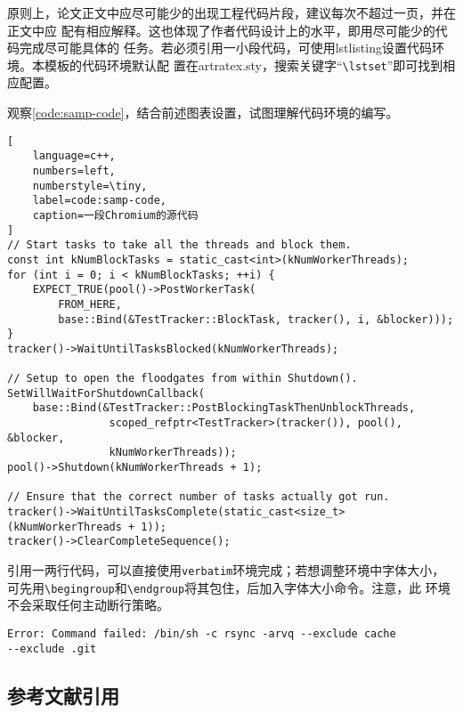 原则上，论文正文中应尽可能少的出现工程代码片段，建议每次不超过一页，并在正文中应
配有相应解释。这也体现了作者代码设计上的水平，即用尽可能少的代码完成尽可能具体的
任务。若必须引用一小段代码，可使用lstlisting设置代码环境。本模板的代码环境默认配
置在artratex.sty，搜索关键字“\verb|\lstset|”即可找到相应配置。

观察\autoref{code:samp-code}，结合前述图表设置，试图理解代码环境的编写。

\begin{lstlisting}[
    language=c++,
    numbers=left,
    numberstyle=\tiny,
    label=code:samp-code,
    caption=一段Chromium的源代码
]
// Start tasks to take all the threads and block them.
const int kNumBlockTasks = static_cast<int>(kNumWorkerThreads);
for (int i = 0; i < kNumBlockTasks; ++i) {
    EXPECT_TRUE(pool()->PostWorkerTask(
        FROM_HERE,
        base::Bind(&TestTracker::BlockTask, tracker(), i, &blocker)));
}
tracker()->WaitUntilTasksBlocked(kNumWorkerThreads);

// Setup to open the floodgates from within Shutdown().
SetWillWaitForShutdownCallback(
    base::Bind(&TestTracker::PostBlockingTaskThenUnblockThreads,
                scoped_refptr<TestTracker>(tracker()), pool(), &blocker,
                kNumWorkerThreads));
pool()->Shutdown(kNumWorkerThreads + 1);

// Ensure that the correct number of tasks actually got run.
tracker()->WaitUntilTasksComplete(static_cast<size_t>(kNumWorkerThreads + 1));
tracker()->ClearCompleteSequence();
\end{lstlisting}

引用一两行代码，可以直接使用\texttt{verbatim}环境完成；若想调整环境中字体大小，
可先用\verb|\begingroup|和\verb|\endgroup|将其包住，后加入字体大小命令。注意，此
环境不会采取任何主动断行策略。

\begingroup
    \small
    \begin{verbatim}
Error: Command failed: /bin/sh -c rsync -arvq --exclude cache
--exclude .git 
    \end{verbatim}
\endgroup

\subsection{参考文献引用}


